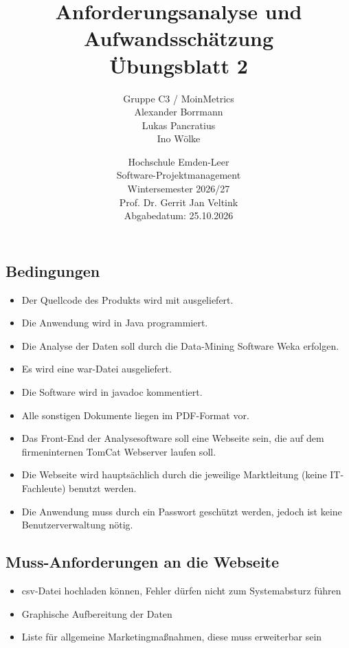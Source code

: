 \documentclass[a4paper,10pt]{article}
\title{Anforderungsanalyse und Aufwandsschätzung\\{\large Übungsblatt 2}}
\author{Gruppe C3 / MoinMetrics\\{}Alexander Borrmann\\{}Lukas Pancratius\\{}Ino Wölke}
\date{Hochschule Emden-Leer\\Software-Projektmanagement\\Wintersemester 2026/27\\Prof. Dr. Gerrit Jan Veltink\\[1em]Abgabedatum: 25.10.2026}
\begin{document}
            \maketitle
        \thispagestyle{fancy}
        \clearpage

        \subsection*{Bedingungen}
        \begin{itemize}
            \item Der Quellcode des Produkts wird mit ausgeliefert.
            \item Die Anwendung wird in Java programmiert.
            \item Die Analyse der Daten soll durch die Data-Mining Software Weka erfolgen.
            \item Es wird eine war-Datei ausgeliefert.
            \item Die Software wird in javadoc kommentiert.
            \item Alle sonstigen Dokumente liegen im PDF-Format vor.
            \item Das Front-End der Analysesoftware soll eine Webseite sein, die auf dem firmeninternen TomCat Webserver laufen soll.
            \item Die Webseite wird hauptsächlich durch die jeweilige Marktleitung (keine IT-Fachleute) benutzt werden.
            \item Die Anwendung muss durch ein Passwort geschützt werden, jedoch ist keine Benutzerverwaltung nötig.
        \end{itemize}

        \subsection*{Muss-Anforderungen an die Webseite}
        \begin{itemize}
            \item csv-Datei hochladen können, Fehler dürfen nicht zum Systemabsturz führen
            \item Graphische Aufbereitung der Daten
            \item Liste für allgemeine Marketingma\ss{}nahmen, diese muss erweiterbar sein
        \end{itemize}
\end{document}
